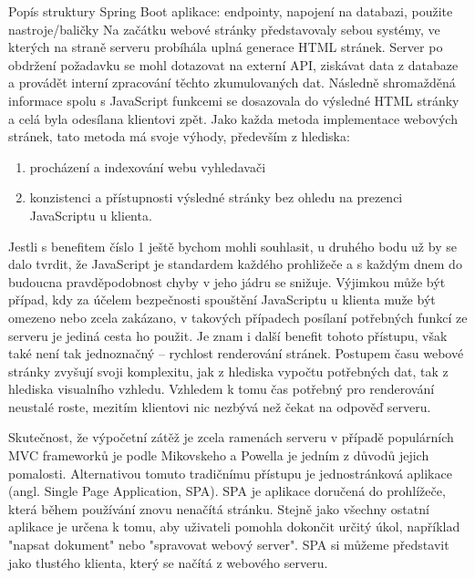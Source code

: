 \documentclass[12pt]{article}
\begin{document}
Popís struktury Spring Boot aplikace: endpointy, napojení na databazi, použite nastroje/baličky
Na začátku webové stránky představovaly sebou systémy, ve kterých na straně serveru probíhála uplná generace HTML stránek.
Server po obdržení požadavku se mohl dotazovat na externí API, ziskávat data z databaze a provádět interní zpracování těchto zkumulovaných dat. 
Následně shromažděná informace spolu s JavaScript funkcemi se dosazovala do výsledné HTML stránky a celá byla odesílana klientovi zpět. 
Jako každa metoda implementace webových stránek, tato metoda má svoje výhody, především z hlediska:
\begin{enumerate}
    \item procházení a indexování webu vyhledavači
    \item konzistenci a přístupnosti výsledné stránky bez ohledu na prezenci JavaScriptu u klienta. 
\end{enumerate}

\hspace{0.5cm} Jestli s benefitem číslo 1 ještě bychom mohli souhlasit, u druhého bodu už by se dalo tvrdit, že JavaScript je standardem každého prohližeče 
a s každým dnem do budoucna pravděpodobnost chyby v jeho jádru se snižuje. Výjimkou může být případ, kdy za účelem bezpečnosti spouštění JavaScriptu u klienta muže být omezeno nebo zcela zakázano, 
v takových případech posílaní potřebných funkcí ze serveru je jediná cesta ho použit. 
Je znam i další benefit tohoto přístupu, však také není tak jednoznačný -- rychlost renderování stránek. Postupem času webové stránky zvyšují svoji komplexitu,
jak z hlediska vypočtu potřebných dat, tak z hlediska visualního vzhledu. Vzhledem k tomu čas potřebný pro renderování neustalé roste, mezitím klientovi nic nezbývá 
než čekat na odpověď serveru.

\hspace{0.5cm} Skutečnost, že výpočetní zátěž je zcela ramenách serveru v případě populárních MVC frameworků je podle Mikovskeho a Powella je jedním z důvodů jejich pomalosti.
Alternativou tomuto tradičnímu přístupu je jednostránková aplikace (angl. Single Page Application, SPA). SPA je aplikace doručená do prohlížeče, která během používání znovu 
nenačítá stránku. Stejně jako všechny ostatní aplikace je určena k tomu, aby uživateli pomohla dokončit určitý úkol, například "napsat dokument" nebo "spravovat webový server". 
SPA si můžeme představit jako tlustého klienta, který se načítá z webového serveru.
\end{document}
